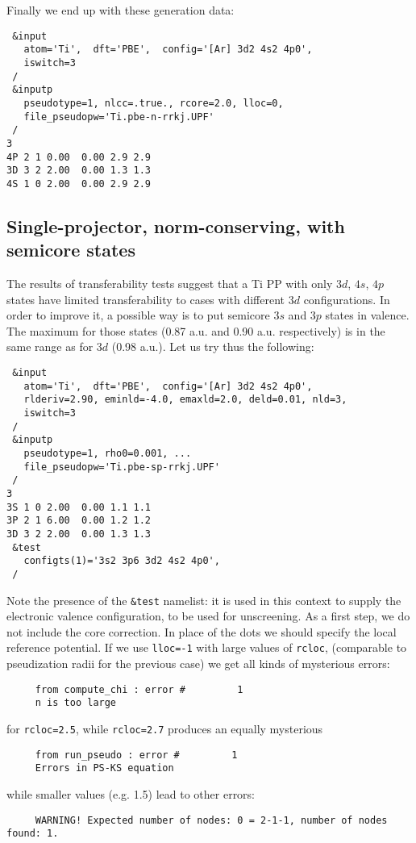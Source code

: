 \documentclass[12pt,a4paper]{article}
\begin{document}
Finally we end up with these generation data:
\begin{verbatim}
 &input
   atom='Ti',  dft='PBE',  config='[Ar] 3d2 4s2 4p0',
   iswitch=3
 /
 &inputp
   pseudotype=1, nlcc=.true., rcore=2.0, lloc=0,
   file_pseudopw='Ti.pbe-n-rrkj.UPF'
 /
3
4P 2 1 0.00  0.00 2.9 2.9
3D 3 2 2.00  0.00 1.3 1.3
4S 1 0 2.00  0.00 2.9 2.9
\end{verbatim}

\subsection {Single-projector, norm-conserving, with semicore states}

The results of transferability tests suggest that a Ti PP with only
$3d$, $4s$, $4p$ states have limited transferability to cases with 
different $3d$ configurations. In order to improve it, a possible
way is to put semicore $3s$ and $3p$ states in valence. The maximum
for those states (0.87 a.u. and 0.90 a.u. respectively) is in the 
same range as for $3d$ (0.98 a.u.). Let us try thus the following:
\begin{verbatim}
 &input
   atom='Ti',  dft='PBE',  config='[Ar] 3d2 4s2 4p0',
   rlderiv=2.90, eminld=-4.0, emaxld=2.0, deld=0.01, nld=3,
   iswitch=3
 /
 &inputp
   pseudotype=1, rho0=0.001, ...
   file_pseudopw='Ti.pbe-sp-rrkj.UPF'
 /
3
3S 1 0 2.00  0.00 1.1 1.1
3P 2 1 6.00  0.00 1.2 1.2
3D 3 2 2.00  0.00 1.3 1.3
 &test
   configts(1)='3s2 3p6 3d2 4s2 4p0',
 /
\end{verbatim}
Note the presence of the \texttt{\&test} namelist: it is used in this
context to supply the electronic valence configuration, to be used
for unscreening. As a first step, we do not include the core correction.
In place of the dots we should specify the local reference potential. 
If we use \texttt{lloc=-1} with large values of \texttt{rcloc},
(comparable to pseudization radii for the previous case) 
we get all kinds of mysterious errors:
\begin{verbatim}
     from compute_chi : error #         1
     n is too large
\end{verbatim}
for \texttt{rcloc=2.5}, while \texttt{rcloc=2.7} produces an equally 
mysterious
\begin{verbatim}
     from run_pseudo : error #         1
     Errors in PS-KS equation
\end{verbatim}
while smaller values (e.g. 1.5) lead to other errors:
\begin{verbatim}
     WARNING! Expected number of nodes: 0 = 2-1-1, number of nodes found: 1.
\end{verbatim}
\end{document}
